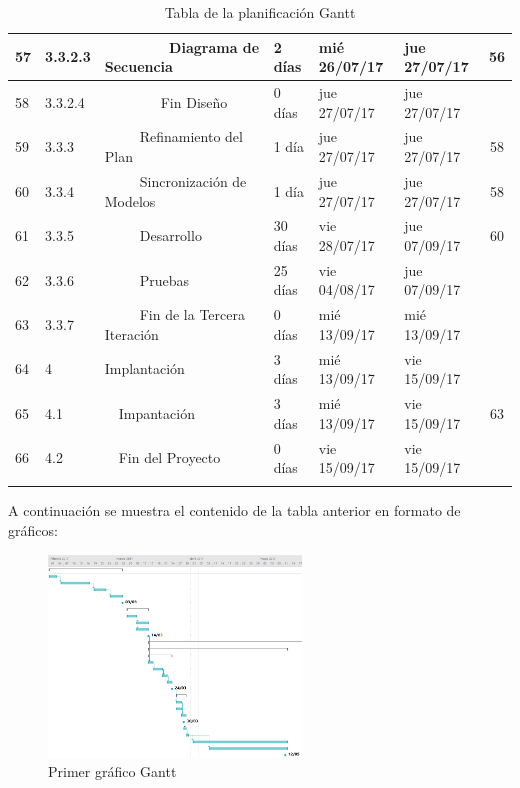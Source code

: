 \begin{center}
\begin{longtable}{  l  l  l  l  l  l  c  }
	57 & 3.3.2.3 &         Diagrama de Secuencia & 2 días & mié 26/07/17 & jue 27/07/17 & 56 \\ \hline
	58 & 3.3.2.4 &         Fin Diseño & 0 días & jue 27/07/17 & jue 27/07/17 &  \\ \hline
	59 & 3.3.3 &      Refinamiento del Plan & 1 día & jue 27/07/17 & jue 27/07/17 & 58 \\ \hline
	60 & 3.3.4 &      Sincronización de Modelos & 1 día & jue 27/07/17 & jue 27/07/17 & 58 \\ \hline
	61 & 3.3.5 &      Desarrollo & 30 días & vie 28/07/17 & jue 07/09/17 & 60 \\ \hline
	62 & 3.3.6 &      Pruebas & 25 días & vie 04/08/17 & jue 07/09/17 &  \\ \hline
	63 & 3.3.7 &      Fin de la Tercera Iteración & 0 días & mié 13/09/17 & mié 13/09/17 &  \\ \hline
	64 & 4 & Implantación & 3 días & mié 13/09/17 & vie 15/09/17 &  \\ \hline
	65 & 4.1 &   Impantación & 3 días & mié 13/09/17 & vie 15/09/17 & 63 \\ \hline
	66 & 4.2 &   Fin del Proyecto & 0 días & vie 15/09/17 & vie 15/09/17 &  \\ \hline
  \caption{Tabla de la planificación Gantt}
  \label{tab:tablagantt}
\end{longtable}
\end{center}

\par A continuación se muestra el contenido de la tabla anterior en formato de gráficos:
\begin{figure}[h]
\begin{center}
\includegraphics[width=0.6\textwidth]{./img/Gantt1.png}
\end{center}
\caption{Primer gráfico Gantt}
\label{tab:gantt1}
\end{figure}

